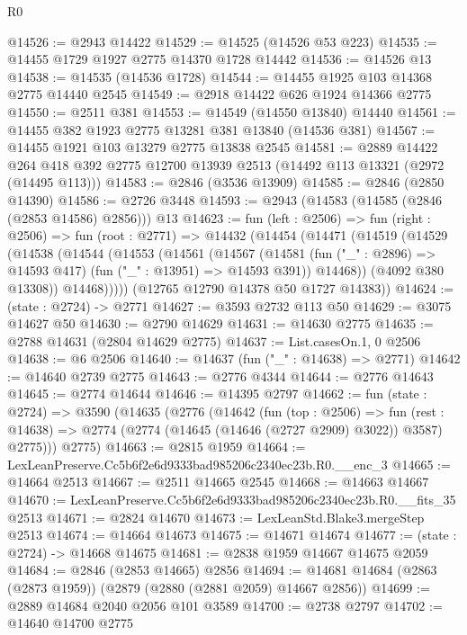 \begin{lexlean}{R0}
\begin{coremodule}
@14526 := @2943 @14422
@14529 := @14525 (@14526 @53 @223)
@14535 := @14455 @1729 @1927 @2775 @14370 @1728 @14442
@14536 := @14526 @13
@14538 := @14535 (@14536 @1728)
@14544 := @14455 @1925 @103 @14368 @2775 @14440 @2545
@14549 := @2918 @14422 @626 @1924 @14366 @2775
@14550 := @2511 @381
@14553 := @14549 (@14550 @13840) @14440
@14561 := @14455 @382 @1923 @2775 @13281 @381 @13840 (@14536 @381)
@14567 := @14455 @1921 @103 @13279 @2775 @13838 @2545
@14581 := @2889
    @14422
    @264
    @418
    @392
    @2775
    @12700
    @13939
    @2513
    (@14492 @113 @13321 (@2972 (@14495 @113)))
@14583 := @2846 (@3536 @13909)
@14585 := @2846 (@2850 @14390)
@14586 := @2726 @3448
@14593 := @2943 (@14583 (@14585 (@2846 (@2853 @14586) @2856))) @13
@14623 := fun (left : @2506) =>
  fun (right : @2506) =>
  fun (root : @2771) =>
  @14432
    (@14454
      (@14471
        (@14519
          (@14529
            (@14538
              (@14544
                (@14553
                  (@14561
                    (@14567
                      (@14581
                        (fun ("_" : @2896) => @14593 @417)
                        (fun ("_" : @13951) => @14593 @391))
                      @14468))
                  (@4092 @380 @13308))
                @14468)))))
      (@12765 @12790 @14378 @50 @1727 @14383))
@14624 := (state : @2724) -> @2771
@14627 := @3593 @2732 @113 @50
@14629 := @3075 @14627 @50
@14630 := @2790 @14629
@14631 := @14630 @2775
@14635 := @2788 @14631 (@2804 @14629 @2775)
@14637 := List.casesOn.{1, 0} @2506
@14638 := @6 @2506
@14640 := @14637 (fun ("_" : @14638) => @2771)
@14642 := @14640 @2739 @2775
@14643 := @2776 @4344
@14644 := @2776 @14643
@14645 := @2774 @14644
@14646 := @14395 @2797
@14662 := fun (state : @2724) =>
  @3590
    (@14635
      (@2776
        (@14642
          (fun (top : @2506) =>
          fun (rest : @14638) => @2774 (@2774 (@14645 (@14646 (@2727 @2909) @3022)) @3587) @2775)))
      @2775)
@14663 := @2815 @1959
@14664 := LexLeanPreserve.Cc5b6f2e6d9333bad985206c2340ec23b.R0.__enc_3
@14665 := @14664 @2513
@14667 := @2511 @14665 @2545
@14668 := @14663 @14667
@14670 := LexLeanPreserve.Cc5b6f2e6d9333bad985206c2340ec23b.R0.__fits_35 @2513
@14671 := @2824 @14670
@14673 := LexLeanStd.Blake3.mergeStep @2513
@14674 := @14664 @14673
@14675 := @14671 @14674
@14677 := (state : @2724) -> @14668 @14675
@14681 := @2838 @1959 @14667 @14675 @2059
@14684 := @2846 (@2853 @14665) @2856
@14694 := @14681 @14684 (@2863 (@2873 @1959)) (@2879 (@2880 (@2881 @2059) @14667 @2856))
@14699 := @2889 @14684 @2040 @2056 @101 @3589
@14700 := @2738 @2797
@14702 := @14640 @14700 @2775

\end{coremodule}
\end{lexlean}
